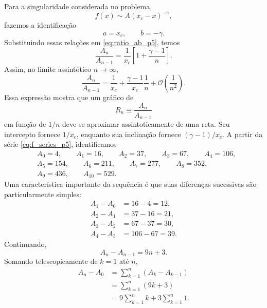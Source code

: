 \documentclass[11pt,a4paper]{article}
\begin{document}
%
Para a singularidade considerada no problema,
%
\begin{equation}
    f(x)\sim A(x_c-x)^{-\gamma},
\end{equation}
%
fazemos a identificação
%
\begin{equation}
    a=x_c,
    \qquad
    b=-\gamma.
\end{equation}
%
Substituindo essas relações em \eqref{eq:ratio_ab_p5}, temos
%
\begin{equation}
    \frac{A_n}{A_{n-1}}
    =
    \frac{1}{x_c}
    \left[
        1+\frac{\gamma-1}{n}
    \right].
    \label{eq:ratio_final_p5}
\end{equation}
%
Assim, no limite assintótico $n\to\infty$,
%
\begin{equation}
    \frac{A_n}{A_{n-1}}
    =
    \frac{1}{x_c}
    +
    \frac{\gamma-1}{x_c}\frac{1}{n}
    +
    \mathcal O\left(\frac{1}{n^2}\right).
    \label{eq:ratio_asymptotic_p5}
\end{equation}
%
Essa expressão mostra que um gráfico de
%
\begin{equation}
    R_n\equiv\frac{A_n}{A_{n-1}}
\end{equation}
%
em função de $1/n$ deve se aproximar assintoticamente de uma reta. Seu
intercepto fornece $1/x_c$, enquanto sua inclinação fornece
$(\gamma-1)/x_c$. A partir da série \eqref{eq:f_series_p5}, identificamos
%
\begin{align}
    &A_0=4,\qquad
    A_1=16,\qquad
    A_2=37,\qquad
    A_3=67,\qquad
    A_4=106,
    \nonumber\\
    &A_5=154,\qquad
    A_6=211,\qquad
    A_7=277,\qquad
    A_8=352,
    \nonumber\\
    &A_9=436,\qquad
    A_{10}=529.
\end{align}
%
Uma característica importante da sequência é que suas diferenças
sucessivas são particularmente simples:
%
\begin{align}
    A_1-A_0 &=16-4=12,\\
    A_2-A_1 &=37-16=21,\\
    A_3-A_2 &=67-37=30,\\
    A_4-A_3 &=106-67=39.
\end{align}
%
Continuando,
%
\begin{equation}
    A_n-A_{n-1}=9n+3.
    \label{eq:difference_An_p5}
\end{equation}
%
Somando telescopicamente de $k=1$ até $n$,
%
\begin{align}
    A_n-A_0
    &=
    \sum_{k=1}^{n}(A_k-A_{k-1})
    \nonumber\\
    &=
    \sum_{k=1}^{n}(9k+3)
    \nonumber\\
    &=
    9\sum_{k=1}^{n}k
    +
    3\sum_{k=1}^{n}1.
\end{align}
\end{document}
